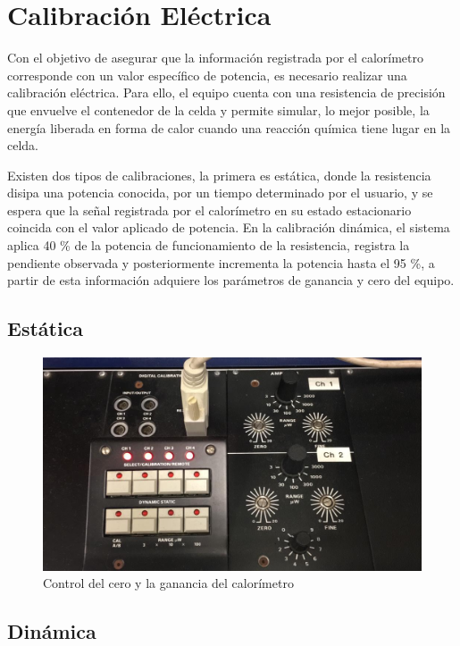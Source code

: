 
%




\chapter{Calibración Eléctrica}
	Con el objetivo de asegurar que la información registrada  por el calorímetro corresponde con un valor específico de potencia, es necesario realizar una calibración eléctrica. Para ello, el equipo cuenta con una resistencia de precisión que envuelve el contenedor de la celda y permite simular, lo mejor posible, la energía liberada en forma de calor cuando una reacción química tiene lugar en la celda. 
	
	Existen dos tipos de calibraciones, la primera es estática, donde la resistencia disipa una potencia conocida, por un tiempo determinado por el usuario, y se espera que la señal registrada por el calorímetro en su estado estacionario coincida con el valor aplicado de potencia. En la calibración dinámica, el sistema aplica 40 \% de la potencia de funcionamiento de la resistencia, registra la pendiente observada y posteriormente incrementa la potencia hasta el 95 \%, a partir de esta información adquiere los par\'ametros de ganancia y cero del equipo.
	\section{Est\'atica}
	\begin{figure}[h]
		\centering
		\includegraphics[width=0.7\linewidth]{Figures/controlCal}
		\caption{Control del cero y la ganancia del calor\'imetro}
		\label{fig: controlCal}
	\end{figure}
	
	\section{Din\'amica}


		